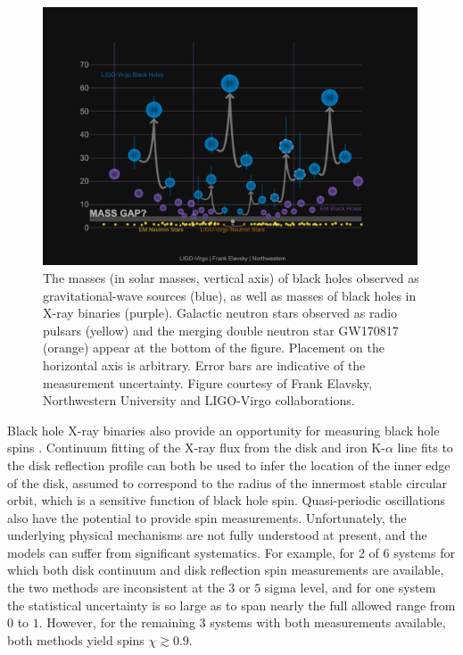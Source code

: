 \documentclass[iop,onecolumn]{revtex4}
\begin{document}
\begin{figure}
	\centering
	\includegraphics[width=0.99\textwidth]{Graveyard-linear.png}%
	\caption{\label{fig:BHmasses}  The masses (in solar masses, vertical axis) of black holes observed as gravitational-wave sources (blue), as well as masses of black holes in X-ray binaries (purple).  Galactic neutron stars observed as radio pulsars (yellow) and the merging double neutron star GW170817 (orange) appear at the bottom of the figure.  Placement on the horizontal axis is arbitrary.  Error bars are indicative of the measurement uncertainty.  Figure courtesy of Frank Elavsky, Northwestern University and LIGO-Virgo collaborations.}
\end{figure}


Black hole X-ray binaries also provide an opportunity for measuring black hole spins \citep[see][for a recent review]{MillerMiller:2015}.  Continuum fitting of the X-ray flux from the disk and iron K-$\alpha$ line fits to the disk reflection profile can both be used to infer the location of the inner edge of the disk, assumed to correspond to the radius of the innermost stable circular orbit, which is a sensitive function of black hole spin.  Quasi-periodic oscillations also have the potential to provide spin measurements.  Unfortunately, the underlying physical mechanisms are not fully understood at present, and the models can suffer from significant systematics.  For example, for 2 of 6 systems for which both disk continuum and disk reflection spin measurements are available, the two methods are inconsistent at the $3$ or $5$ sigma level, and for one system the statistical uncertainty is so large as to span nearly the full allowed range from $0$ to $1$.  However, for the remaining 3 systems with both measurements available, both methods yield spins $\chi \gtrsim 0.9$.  
\end{document}
